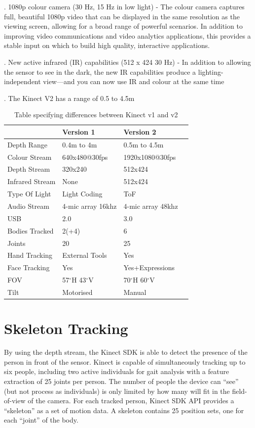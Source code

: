 .	1080p colour camera (30 Hz, 15 Hz in low light) - The colour camera captures full, beautiful 1080p video that can be displayed in the same resolution as the viewing screen, allowing for a broad range of powerful scenarios. In addition to improving video communications and video analytics applications, this provides a stable input on which to build high quality, interactive applications.

.	New active infrared (IR) capabilities (512 x 424 30 Hz) - In addition to allowing the sensor to see in the dark, the new IR capabilities produce a lighting-independent view—and you can now use IR and colour at the same time

.	The Kinect V2 has a range of 0.5 to 4.5m

\newpage
\begin{table}[h]
\centering
\begin{tabular}{ |p{4cm}||p{4cm}|p{4cm}|p{4cm}| }
 \hline
 \cellcolor{pink} & \cellcolor{pink} Version 1  &  \cellcolor{pink} Version 2 \\
 \hline
Depth Range  & 0.4m to 4m  & 0.5m to 4.5m  \\
Colour Stream & 640x480@30fps & 1920x1080@30fps \\
Depth Stream  & 320x240  & 512x424  \\
Infrared Stream & None & 512x424  \\
Type Of Light  & Light Coding  & ToF  \\
Audio Stream & 4-mic array 16khz & 4-mic array 48khz \\
USB  & 2.0  & 3.0  \\
Bodies Tracked  & 2(+4) & 6  \\
Joints & 20 & 25 \\
Hand Tracking & External Tools  & Yes  \\
Face Tracking  & Yes  & Yes+Expressions  \\
FOV & 57$^{\circ}$H 43$^{\circ}$V & 70$^{\circ}$H 60$^{\circ}$V \\
Tilt  & Motorised  & Manual  \\
\hline
\end{tabular}
\caption{Table specifying differences between Kinect v1 and v2}
\end{table}

\section{Skeleton Tracking} \label{Skeleton Tracking} 
\noindent By using the depth stream, the Kinect SDK is able to detect the presence of the person in front of the sensor. Kinect is capable of simultaneously tracking up to six people, including two active individuals for gait analysis with a feature extraction of 25 joints per person. The number of people the device can “see” (but not process as individuals) is only limited by how many will fit in the field-of-view of the camera. For each tracked person, Kinect SDK API provides a “skeleton” as a set of motion data. A skeleton contains 25 position sets, one for each “joint” of the body.

